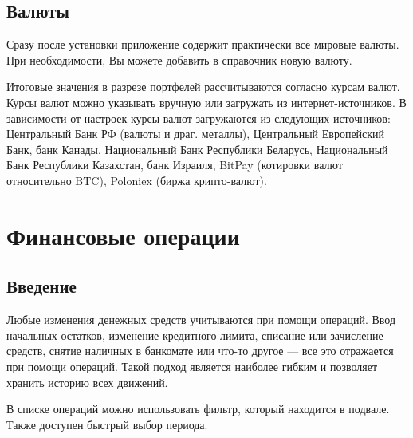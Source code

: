 \documentclass[a4paper,10pt,russian]{sphinxmanual}
\begin{document}
\noindent{}

\noindent{}


\section{Валюты}
\label{\detokenize{directories:id10}}
Сразу после установки приложение содержит практически все мировые валюты. При необходимости, Вы можете добавить в справочник новую валюту.

Итоговые значения в разрезе портфелей рассчитываются согласно курсам валют. Курсы валют можно указывать вручную или
загружать из интернет-источников. В зависимости от настроек курсы валют загружаются из следующих источников:
Центральный Банк РФ (валюты и драг. металлы), Центральный Европейский Банк, банк Канады, Национальный Банк Республики Беларусь,
Национальный Банк Республики Казахстан, банк Израиля, BitPay (котировки валют относительно BTC), Poloniex (биржа крипто-валют).


\chapter{Финансовые операции}
\label{\detokenize{transactions:chapter-transactions}}\label{\detokenize{transactions:id1}}\label{\detokenize{transactions::doc}}

\section{Введение}
\label{\detokenize{transactions:id2}}
Любые изменения денежных средств учитываются при помощи операций. Ввод начальных остатков,
изменение кредитного лимита, списание или зачисление средств, снятие наличных в банкомате или
что-то другое — все это отражается при помощи операций. Такой
подход является наиболее гибким и позволяет хранить историю всех движений.

\noindent{}

\noindent{}

\noindent{}

В списке операций можно использовать фильтр, который находится в подвале. Также доступен быстрый выбор периода.
\end{document}
